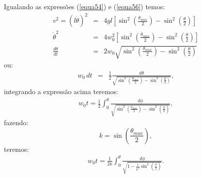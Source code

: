 \documentclass[12pt,openright,twoside,english,brazil]{abntex2}
\begin{document}
Igualando as expressões (\ref{equa54}) e (\ref{equa56}) temos:
\begin{eqnarray}
 v^2 = (l \dot{\theta})^2 & = & 4gl \left[ \sin^2{\left( \frac{\theta_{max}}{2} \right)} - \sin^2{\left( \frac{\theta}{2} \right)} \right] \nonumber \\
 \dot{\theta}^2 & = & 4 w_0^2 \left[ \sin^2{\left( \frac{\theta_{max}}{2} \right)} - \sin^2{\left( \frac{\theta}{2} \right)} \right] \nonumber \\
 \frac{d\theta}{dt} & = & 2w_0 \sqrt{\sin^2{\left( \frac{\theta_{max}}{2} \right)} - \sin^2{\left( \frac{\theta}{2} \right)}}
\end{eqnarray}
ou:
\begin{eqnarray}
 w_0\, dt & = & \frac{1}{2} \frac{d\theta}{\sqrt{\sin^2{\left( \frac{\theta_{max}}{2} \right)} - \sin^2{\left( \frac{\theta}{2} \right)}}}, \nonumber
\end{eqnarray}
integrando a expressão acima teremos:
\begin{eqnarray}
 w_0t = \frac{1}{2} \int_0^{\theta} \frac{d\phi}{\sqrt{\sin^2{\left( \frac{\theta_{max}}{2} \right)} - \sin^2{\left( \frac{\phi}{2} \right)}}},
\end{eqnarray}
fazendo:
\begin{equation}
 k = \sin{\left( \frac{\theta_{max}}{2} \right)},
 \label{equa60}
\end{equation}
teremos:
\begin{eqnarray}
 w_0t = \frac{1}{2k} \int_0^{\theta} \frac{d\phi}{\sqrt{1 - \frac{1}{k^2} \sin^2{\left( \frac{\phi}{2} \right)}}}.
\end{eqnarray}
\end{document}
